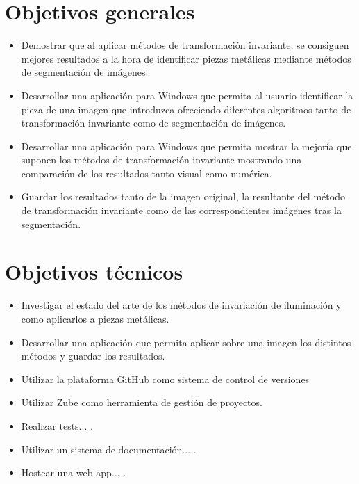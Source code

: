 

\section{Objetivos generales}\label{objetivos-generales}

\begin{itemize}
    \tightlist
        \item
            Demostrar que al aplicar métodos de transformación invariante, se consiguen mejores resultados a la hora de identificar piezas metálicas mediante métodos de segmentación de imágenes.
        \item
            Desarrollar una aplicación para Windows que permita al usuario identificar la pieza de una imagen que introduzca ofreciendo diferentes algoritmos tanto de transformación invariante como de segmentación de imágenes.
        \item
            Desarrollar una aplicación para Windows que permita mostrar la mejoría que suponen los métodos de transformación invariante mostrando una comparación de los resultados tanto visual como numérica.
        \item
            Guardar los resultados tanto de la imagen original, la resultante del método de transformación invariante como de las correspondientes imágenes tras la segmentación.
\end{itemize}

\section{Objetivos técnicos}\label{objetivos-tecnicos}

\begin{itemize}
    \tightlist
        \item
            Investigar el estado del arte de los métodos de invariación de iluminación y como aplicarlos a piezas metálicas.
        \item
            Desarrollar una aplicación que permita aplicar sobre una imagen los distintos métodos y guardar los resultados.
        \item
            Utilizar la plataforma GitHub como sistema de control de versiones
        \item
            Utilizar Zube como herramienta de gestión de proyectos.
        \item
            Realizar tests... .
        \item
            Utilizar un sistema de documentación... .
        \item
            Hostear una web app... .
\end{itemize}


